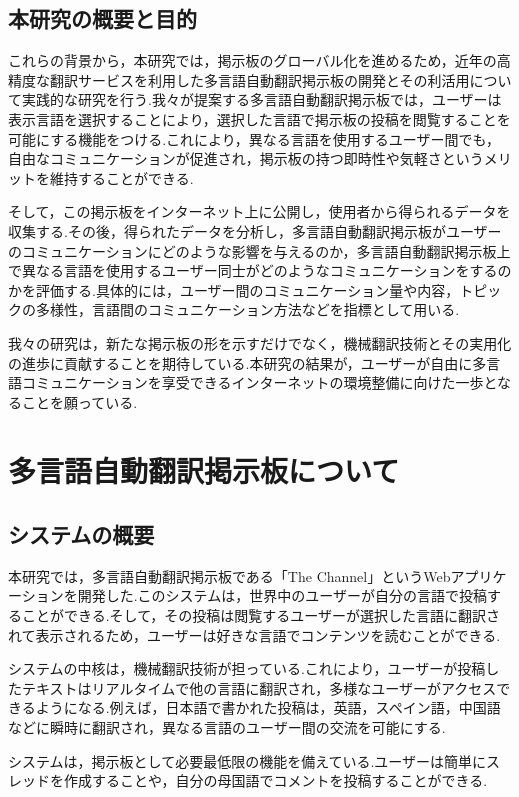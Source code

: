 \documentclass[b5paper,12pt,dvipdfmx]{jsreport}
\begin{document}
\section{本研究の概要と目的}

これらの背景から，本研究では，掲示板のグローバル化を進めるため，近年の高精度な翻訳サービスを利用した多言語自動翻訳掲示板の開発とその利活用について実践的な研究を行う.我々が提案する多言語自動翻訳掲示板では，ユーザーは表示言語を選択することにより，選択した言語で掲示板の投稿を閲覧することを可能にする機能をつける.これにより，異なる言語を使用するユーザー間でも，自由なコミュニケーションが促進され，掲示板の持つ即時性や気軽さというメリットを維持することができる.

そして，この掲示板をインターネット上に公開し，使用者から得られるデータを収集する.その後，得られたデータを分析し，多言語自動翻訳掲示板がユーザーのコミュニケーションにどのような影響を与えるのか，多言語自動翻訳掲示板上で異なる言語を使用するユーザー同士がどのようなコミュニケーションをするのかを評価する.具体的には，ユーザー間のコミュニケーション量や内容，トピックの多様性，言語間のコミュニケーション方法などを指標として用いる.

我々の研究は，新たな掲示板の形を示すだけでなく，機械翻訳技術とその実用化の進歩に貢献することを期待している.本研究の結果が，ユーザーが自由に多言語コミュニケーションを享受できるインターネットの環境整備に向けた一歩となることを願っている.


\chapter{多言語自動翻訳掲示板について}


\section{システムの概要}

本研究では，多言語自動翻訳掲示板である「The Channel」というWebアプリケーションを開発した.このシステムは，世界中のユーザーが自分の言語で投稿することができる.そして，その投稿は閲覧するユーザーが選択した言語に翻訳されて表示されるため，ユーザーは好きな言語でコンテンツを読むことができる.

システムの中核は，機械翻訳技術が担っている.これにより，ユーザーが投稿したテキストはリアルタイムで他の言語に翻訳され，多様なユーザーがアクセスできるようになる.例えば，日本語で書かれた投稿は，英語，スペイン語，中国語などに瞬時に翻訳され，異なる言語のユーザー間の交流を可能にする.

システムは，掲示板として必要最低限の機能を備えている.ユーザーは簡単にスレッドを作成することや，自分の母国語でコメントを投稿することができる.
\end{document}
